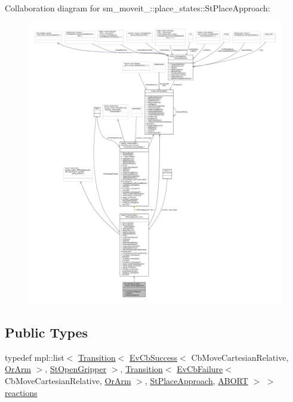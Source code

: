 Collaboration diagram for sm\+\_\+moveit\+\_\+:\+:place\+\_\+states\+:\+:St\+Place\+Approach\+:
\nopagebreak
\begin{figure}[H]
\begin{center}
\leavevmode
\includegraphics[width=350pt]{structsm__moveit__4_1_1place__states_1_1StPlaceApproach__coll__graph}
\end{center}
\end{figure}
\subsection*{Public Types}
\begin{DoxyCompactItemize}
\item 
typedef mpl\+::list$<$ \hyperlink{classsmacc_1_1Transition}{Transition}$<$ \hyperlink{structsmacc_1_1EvCbSuccess}{Ev\+Cb\+Success}$<$ Cb\+Move\+Cartesian\+Relative, \hyperlink{classsm__moveit__4_1_1OrArm}{Or\+Arm} $>$, \hyperlink{structsm__moveit__4_1_1place__states_1_1StOpenGripper}{St\+Open\+Gripper} $>$, \hyperlink{classsmacc_1_1Transition}{Transition}$<$ \hyperlink{structsmacc_1_1EvCbFailure}{Ev\+Cb\+Failure}$<$ Cb\+Move\+Cartesian\+Relative, \hyperlink{classsm__moveit__4_1_1OrArm}{Or\+Arm} $>$, \hyperlink{structsm__moveit__4_1_1place__states_1_1StPlaceApproach}{St\+Place\+Approach}, \hyperlink{structsmacc_1_1default__transition__tags_1_1ABORT}{A\+B\+O\+RT} $>$ $>$ \hyperlink{structsm__moveit__4_1_1place__states_1_1StPlaceApproach_a700162e35faa9c26389e84dbc82b5a89}{reactions}
\end{DoxyCompactItemize}
